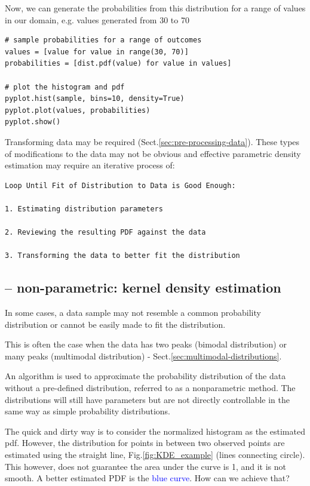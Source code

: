 Now, we can generate the probabilities from this distribution for a range of values in our domain, e.g. 
values generated from 30 to 70
\begin{lstlisting}
# sample probabilities for a range of outcomes
values = [value for value in range(30, 70)]
probabilities = [dist.pdf(value) for value in values]

# plot the histogram and pdf
pyplot.hist(sample, bins=10, density=True)
pyplot.plot(values, probabilities)
pyplot.show()
\end{lstlisting}

Transforming data may be required (Sect.\ref{sec:pre-processing-data}).
These types of modifications to the data may not be obvious and effective
parametric density estimation may require an iterative process of:
\begin{verbatim}
Loop Until Fit of Distribution to Data is Good Enough:

1. Estimating distribution parameters

2. Reviewing the resulting PDF against the data

3. Transforming the data to better fit the distribution
\end{verbatim}


\subsection{-- non-parametric: kernel density estimation}

In some cases, a data sample may not resemble a common probability distribution
or cannot be easily made to fit the distribution.

This is often the case when the data has two peaks (bimodal distribution) or
many peaks (multimodal distribution) - Sect.\ref{sec:multimodal-distributions}.

An algorithm is used to approximate the probability distribution of the data
without a pre-defined distribution, referred to as a nonparametric method.
The distributions will still have parameters but are not directly controllable
in the same way as simple probability distributions.

The quick and dirty way is to consider the normalized histogram as the estimated
pdf. However, the distribution for points in between two observed points are
estimated using the straight line, Fig.\ref{fig:KDE_example} (lines connecting
circle). This however, does not guarantee the area under the curve is 1, and it
is not smooth. A better estimated PDF is the \textcolor{blue}{blue curve}. How
can we achieve that?

